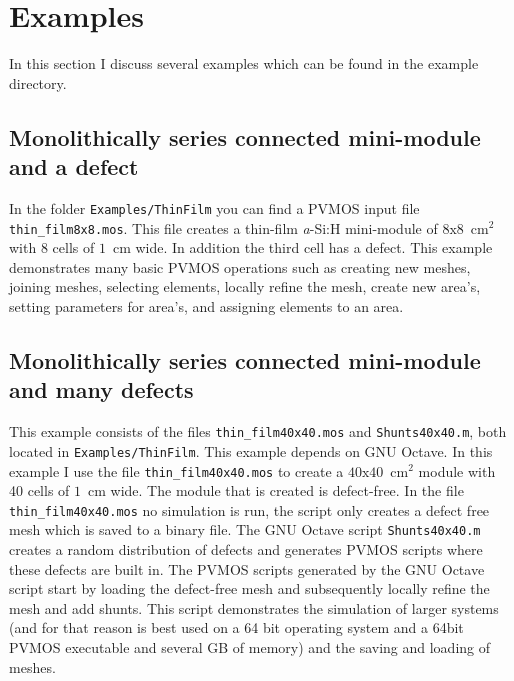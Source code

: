 \documentclass[noshowpacs,preprintnumbers,amsmath,amssymb, letter]{revtex4}
\newcommand{\Un}[2]{\mbox{$\mathrm{#1}$ $\mathrm{#2}$}}
\newcommand{\ASI}{\lowercase{\emph{a}}-S\lowercase{i}:H}
\begin{document}
\section{Examples}
In this section I discuss several examples which can be found in the example directory.
\subsection{Monolithically series connected mini-module and a defect}
In the folder \texttt{Examples/ThinFilm} you can find a PVMOS input file \texttt{thin\_film8x8.mos}. This file creates a thin-film \ASI{} mini-module of \Un{8x8}{cm^2} with 8 cells of \Un{1}{cm} wide. In addition the third cell has a defect. This example demonstrates many basic PVMOS operations such as creating new meshes, joining meshes, selecting elements, locally refine the mesh, create new area's, setting parameters for area's, and assigning elements to an area. 
\subsection{Monolithically series connected mini-module and many defects}
This example consists of the files \texttt{thin\_film40x40.mos} and \texttt{Shunts40x40.m}, both located in \texttt{Examples/ThinFilm}. This example depends on GNU Octave. In this example I use the file \texttt{thin\_film40x40.mos} to create a \Un{40x40}{cm^2} module with 40 cells of \Un{1}{cm} wide. The module that is created is defect-free. In the file \texttt{thin\_film40x40.mos} no simulation is run, the script only creates a defect free mesh which is saved to a binary file. The GNU Octave script \texttt{Shunts40x40.m} creates a random distribution of defects and generates PVMOS scripts where these defects are built in. The PVMOS scripts generated by the GNU Octave script start by loading the defect-free mesh and subsequently locally refine the mesh and add shunts. This script demonstrates the simulation of larger systems (and for that reason is best used on a 64 bit operating system and a 64bit PVMOS executable and several GB of memory) and the saving and loading of meshes. 
\end{document}

